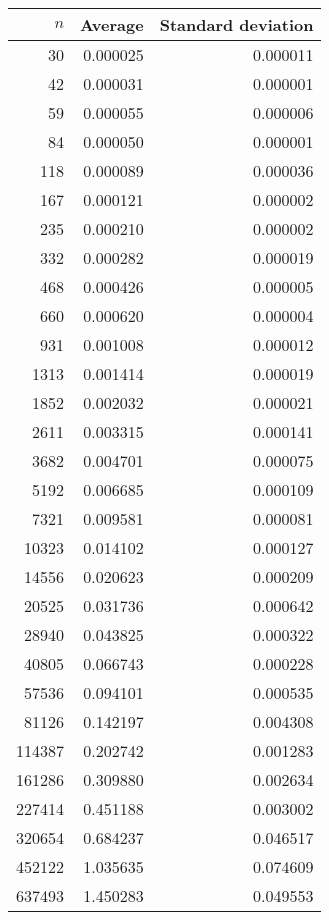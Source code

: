 \begin{tabular}{rrr}
$n$ & Average & Standard deviation\\\hline
30 & 0.000025 & 0.000011\\
42 & 0.000031 & 0.000001\\
59 & 0.000055 & 0.000006\\
84 & 0.000050 & 0.000001\\
118 & 0.000089 & 0.000036\\
167 & 0.000121 & 0.000002\\
235 & 0.000210 & 0.000002\\
332 & 0.000282 & 0.000019\\
468 & 0.000426 & 0.000005\\
660 & 0.000620 & 0.000004\\
931 & 0.001008 & 0.000012\\
1313 & 0.001414 & 0.000019\\
1852 & 0.002032 & 0.000021\\
2611 & 0.003315 & 0.000141\\
3682 & 0.004701 & 0.000075\\
5192 & 0.006685 & 0.000109\\
7321 & 0.009581 & 0.000081\\
10323 & 0.014102 & 0.000127\\
14556 & 0.020623 & 0.000209\\
20525 & 0.031736 & 0.000642\\
28940 & 0.043825 & 0.000322\\
40805 & 0.066743 & 0.000228\\
57536 & 0.094101 & 0.000535\\
81126 & 0.142197 & 0.004308\\
114387 & 0.202742 & 0.001283\\
161286 & 0.309880 & 0.002634\\
227414 & 0.451188 & 0.003002\\
320654 & 0.684237 & 0.046517\\
452122 & 1.035635 & 0.074609\\
637493 & 1.450283 & 0.049553\\
\end{tabular}
